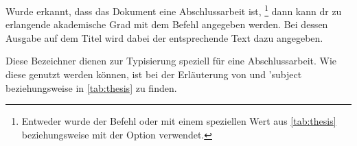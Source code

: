 \documentclass[%
  english,ngerman,%
  headings=optiontoheadandtoc,captions=tableheading,numbers=noenddot,%
  chapterpage,cdfoot,%
]{tudscrman}
\begin{document}
\begin{Declaration}{}
\printdeclarationlist%
%
%
Wurde erkannt, dass das Dokument eine Abschlussarbeit ist,%
\footnote{%
  Entweder wurde der Befehl  oder  mit einem 
  speziellen Wert aus \autoref{tab:thesis} beziehungsweise mit der Option 
   verwendet.
}
dann kann dr zu erlangende akademische Grad mit dem Befehl  
angegeben werden. Bei dessen Ausgabe auf dem Titel wird dabei der entsprechende 
Text dazu angegeben.
\end{Declaration}

\begin{Declaration}{}
\begin{Declaration}{}
\begin{Declaration}{}
\begin{Declaration}{}
\begin{Declaration}{}
\begin{Declaration}{}
\begin{Declaration}{}
\begin{Declaration}{}
\begin{Declaration}{}
\begin{Declaration}{}
\begin{Declaration}{}
\printdeclarationlist%
%
%
Diese Bezeichner dienen zur Typisierung speziell für eine Abschlussarbeit. Wie 
diese genutzt werden können, ist bei der Erläuterung von  und 
\Macro'{subject} beziehungsweise in \autoref{tab:thesis} zu finden.
\end{Declaration}
\end{Declaration}
\end{Declaration}
\end{Declaration}
\end{Declaration}
\end{Declaration}
\end{Declaration}
\end{Declaration}
\end{Declaration}
\end{Declaration}
\end{Declaration}
\end{document}

